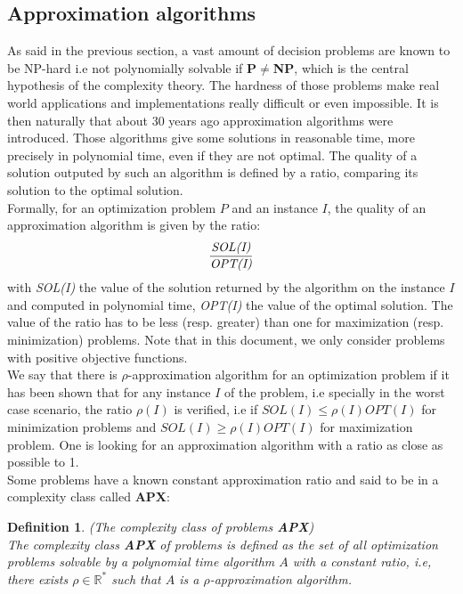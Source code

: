\documentclass[a4paper]{book}
\newtheorem{definition}{Definition}
\begin{document}
\subsection{Approximation algorithms}
As said in the previous section, a vast amount of decision problems are known to be NP-hard i.e not polynomially solvable if \textbf{P$\ne$NP}, which is the central hypothesis of the complexity theory. The hardness of those problems make real world applications and implementations really difficult or even impossible. It is then naturally that about 30 years ago approximation algorithms were introduced. Those algorithms give some solutions in reasonable time, more precisely in polynomial time, even if they are not optimal. The quality of a solution outputed by such an algorithm is defined by a ratio, comparing its solution to the optimal solution. \\



Formally, for an optimization problem $P$ and an instance $I$, the quality of an approximation algorithm is given by the ratio:%
$$ \frac{\emph{SOL(I)}}{\emph{OPT(I)}}$$
with \emph{SOL(I)} the value of the solution returned by the algorithm on the instance $I$ and computed in polynomial time, \emph{OPT(I)} the value of the optimal solution. The value of the ratio has to be less (resp. greater) than one for maximization (resp. minimization) problems. Note that in this document, we only consider problems with positive objective functions.\\
We say that there is $\rho$-approximation algorithm for an optimization problem if it has been shown that for any instance $I$ of the problem, i.e specially in the worst case scenario, the ratio $\rho(I)$ is verified, i.e if $SOL(I) \leq \rho(I) OPT(I)$ for minimization problems and $SOL(I) \geq \rho(I) OPT(I)$ for maximization problem. One is looking for an approximation algorithm with a ratio as close as possible to 1. \\

Some problems have a known constant approximation ratio and said to be in a complexity class called \textbf{APX}:
\begin{definition}{\emph{(The complexity class of problems \textbf{APX})}}\\
The complexity class \emph{\textbf{APX}} of problems is defined as the set of all optimization problems solvable by a polynomial time algorithm $A$ with a constant ratio, i.e, there exists $\rho \in \mathbb{R}^*$ such that $A$ is a $\rho$-approximation algorithm. 
\end{definition}
\end{document}
